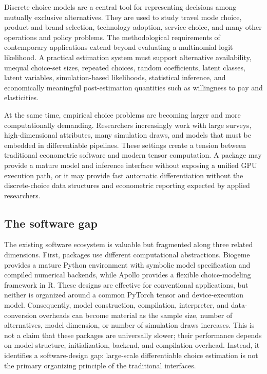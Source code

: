 \documentclass[11pt]{article}
\begin{document}
Discrete choice models are a central tool for representing decisions among
mutually exclusive alternatives. They are used to study travel mode choice,
product and brand selection, technology adoption, service choice, and many other
operations and policy problems. The methodological requirements of contemporary
applications extend beyond evaluating a multinomial logit likelihood. A practical
estimation system must support alternative availability, unequal choice-set sizes,
repeated choices, random coefficients, latent classes, latent variables,
simulation-based likelihoods, statistical inference, and economically meaningful
post-estimation quantities such as willingness to pay and elasticities.

At the same time, empirical choice problems are becoming larger and more
computationally demanding. Researchers increasingly work with large surveys,
high-dimensional attributes, many simulation draws, and models that must be
embedded in differentiable pipelines. These settings create a tension between
traditional econometric software and modern tensor computation. A package may
provide a mature model and inference interface without exposing a unified GPU
execution path, or it may provide fast automatic differentiation without the
discrete-choice data structures and econometric reporting expected by applied
researchers.

\subsection{The software gap}

The existing software ecosystem is valuable but fragmented along three related
dimensions. First, packages use different computational abstractions. Biogeme
provides a mature Python environment with symbolic model specification and
compiled numerical backends, while Apollo provides a flexible choice-modeling
framework in R. These designs are effective for conventional applications, but
neither is organized around a common PyTorch tensor and device-execution model.
Consequently, model construction, compilation, interpreter, and data-conversion
overheads can become material as the sample size, number of alternatives, model
dimension, or number of simulation draws increases. This is not a claim that
these packages are universally slower; their performance depends on model
structure, initialization, backend, and compilation overhead. Instead, it
identifies a software-design gap: large-scale differentiable choice estimation
is not the primary organizing principle of the traditional interfaces.
\end{document}
